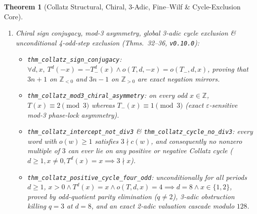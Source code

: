 \documentclass[11pt,reqno]{amsart}
\theoremstyle{plain}
\newtheorem{theorem}{Theorem}[section]
\theoremstyle{definition}
\newcommand{\Z}{\mathbb{Z}}
\newcommand{\code}[1]{{\upshape\nolinkurl{#1}}}
\begin{document}
\begin{theorem}[Collatz Structural, Chiral, 3-Adic, Fine--Wilf \& Cycle-Exclusion Core]
\begin{enumerate}
    \begin{itemize}
      \item {\small\code{thm_collatz_positive_cycle_three_odd}}: unconditionally for \emph{all} periods $d \ge 1$, $x > 0 \land T^d(x) = x \land o(T,d,x) = 3 \implies d = 6 \land x \in \{1, 2\}$ (for $d \ge 8$, $(2^d - 27) \mid 9 + 3\cdot 2^m + 2^n < 2(2^d - 27)$ forces $2^d = 36 + 3\cdot 2^m + 2^n$, which fails modulo $4$, $8$, or $32$ for every $1 \le m < n$).
      \item {\small\code{thm_collatz_intercept_upper_bound}}: sharp universal affine intercept ceiling $c(w) \le 2^{|w|-o(w)}(3^{o(w)} - 2^{o(w)})$ for every parity word $w \in \{0,1\}^*$ (attained with equality on $w = [0,0,1,1]$, $c = 20$).
      \item {\small\code{thm_collatz_cycle_amplitude_ceiling}}: global Eliahou--Steiner Diophantine amplitude bound $(2^d - 3^o)x \le 2^{d-o}(3^o - 2^o)$ for every positive cycle $T^d(x) = x$, linking any computational convergence floor $x \ge M$ directly to the linear form $2^d - 3^o$.
    \end{itemize}
  \item \emph{Chiral sign conjugacy, mod-3 asymmetry, global 3-adic cycle exclusion \& unconditional 4-odd-step exclusion (Thms.~32--36, \texttt{v0.10.0}):}
    \begin{itemize}
      \item {\small\code{thm_collatz_sign_conjugacy}}: $\forall d, x,\ T^d(-x) = -T_-^d(x) \land o(T,d,-x) = o(T_-,d,x)$, proving that $3n+1$ on $\Z_{<0}$ and $3n-1$ on $\Z_{>0}$ are exact negation mirrors.
      \item {\small\code{thm_collatz_mod3_chiral_asymmetry}}: on every odd $x \in \Z$, $T(x) \equiv 2 \pmod 3$ whereas $T_-(x) \equiv 1 \pmod 3$ (exact $\varepsilon$-sensitive mod-3 phase-lock asymmetry).
      \item {\small\code{thm_collatz_intercept_not_div3}} \& {\small\code{thm_collatz_cycle_no_div3}}: every word with $o(w) \ge 1$ satisfies $3 \nmid c(w)$, and consequently \emph{no nonzero multiple of $3$ can ever lie on any positive or negative Collatz cycle} ($d \ge 1, x \ne 0, T^d(x) = x \implies 3 \nmid x$).
      \item {\small\code{thm_collatz_positive_cycle_four_odd}}: unconditionally for \emph{all} periods $d \ge 1$, $x > 0 \land T^d(x) = x \land o(T,d,x) = 4 \implies d = 8 \land x \in \{1, 2\}$, proved by odd-quotient parity elimination ($q \ne 2$), 3-adic obstruction killing $q = 3$ at $d = 8$, and an exact 2-adic valuation cascade modulo $128$.
    \end{itemize}
\end{enumerate}
\end{theorem}
\end{document}
